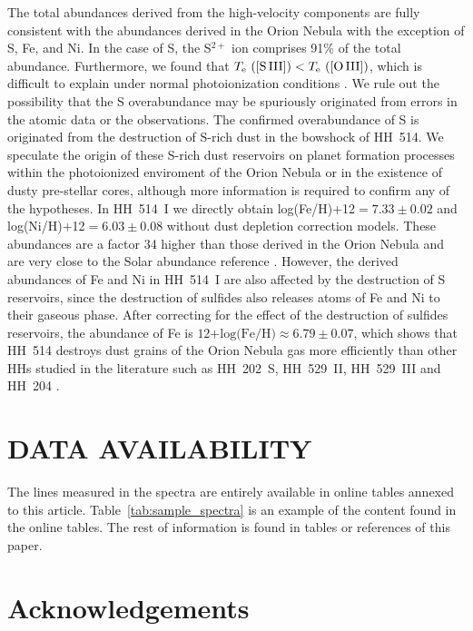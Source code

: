 \documentclass[fleqn,usenatbib]{mnras}
\begin{document}
The total abundances derived from the high-velocity components are fully consistent with the abundances derived in the Orion Nebula with the exception of S, Fe, and Ni. In the case of S, the S$^{2+}$ ion comprises 91\% of the total abundance. Furthermore, we found that $T_{\rm e} \text{ ([S\thinspace III])} < T_{\rm e} \text{ ([O\thinspace III])} $, which is difficult to explain under normal photoionization conditions \citep[][]{Binette2012}. We rule out the possibility that the S overabundance may be spuriously originated from errors in the atomic data or the observations. The confirmed overabundance of S is originated from the destruction of S-rich dust in the bowshock of HH~514. We speculate the origin of these S-rich dust reservoirs on planet formation processes within the photoionized enviroment of the Orion Nebula or in the existence of dusty pre-stellar cores, although more information is required to confirm any of the hypotheses. In HH~514~I we directly obtain log(Fe/H)+12$=  7.33 \pm 0.02$ and log(Ni/H)+12$= 6.03 \pm 0.08$ without dust depletion correction models. These abundances are a factor 34 higher than those derived in the Orion Nebula and are very close to the Solar abundance reference \citep[][]{lodders19}.  However, the derived abundances of Fe and Ni in HH~514~I are also affected by the destruction of S reservoirs, since the destruction of sulfides also releases atoms of Fe and Ni to their gaseous phase. After correcting for the effect of the destruction of sulfides reservoirs, the abundance of Fe is $\text{12+log(Fe/H)}\approx6.79 \pm 0.07$, which shows that HH~514 destroys dust grains of the Orion Nebula gas more efficiently than other HHs studied in the literature such as HH~202~S, HH~529~II, HH~529~III and HH~204 \citep[][]{mesadelgado09, mendez2021, mendez2021-2}.




\section*{DATA AVAILABILITY}
The lines measured in the spectra are entirely available in online tables annexed to this article. Table~\ref{tab:sample_spectra} is an example of the content found in the online tables. The rest of information is found in tables or references of this paper.


\section*{Acknowledgements}
\end{document}
